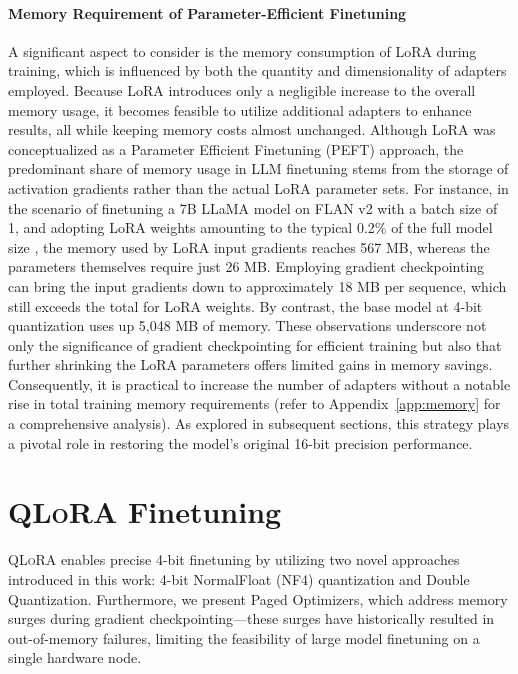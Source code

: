 \paragraph{Memory Requirement of Parameter-Efficient Finetuning} A significant aspect to consider is the memory consumption of LoRA during training, which is influenced by both the quantity and dimensionality of adapters employed. Because LoRA introduces only a negligible increase to the overall memory usage, it becomes feasible to utilize additional adapters to enhance results, all while keeping memory costs almost unchanged. Although LoRA was conceptualized as a Parameter Efficient Finetuning (PEFT) approach, the predominant share of memory usage in LLM finetuning stems from the storage of activation gradients rather than the actual LoRA parameter sets. For instance, in the scenario of finetuning a 7B LLaMA model on FLAN v2 with a batch size of 1, and adopting LoRA weights amounting to the typical 0.2\% of the full model size \citep{hu2021lora,liu2022few}, the memory used by LoRA input gradients reaches 567 MB, whereas the parameters themselves require just 26 MB. Employing gradient checkpointing~\citep{chen2016training} can bring the input gradients down to approximately 18 MB per sequence, which still exceeds the total for LoRA weights. By contrast, the base model at 4-bit quantization uses up 5,048 MB of memory. These observations underscore not only the significance of gradient checkpointing for efficient training but also that further shrinking the LoRA parameters offers limited gains in memory savings. Consequently, it is practical to increase the number of adapters without a notable rise in total training memory requirements (refer to Appendix~\ref{app:memory} for a comprehensive analysis). As explored in subsequent sections, this strategy plays a pivotal role in restoring the model’s original 16-bit precision performance.

\section{\textsc{QLoRA} Finetuning}

\textsc{QLoRA} enables precise 4-bit finetuning by utilizing two novel approaches introduced in this work: 4-bit NormalFloat (NF4) quantization and Double Quantization. Furthermore, we present Paged Optimizers, which address memory surges during gradient checkpointing—these surges have historically resulted in out-of-memory failures, limiting the feasibility of large model finetuning on a single hardware node.

